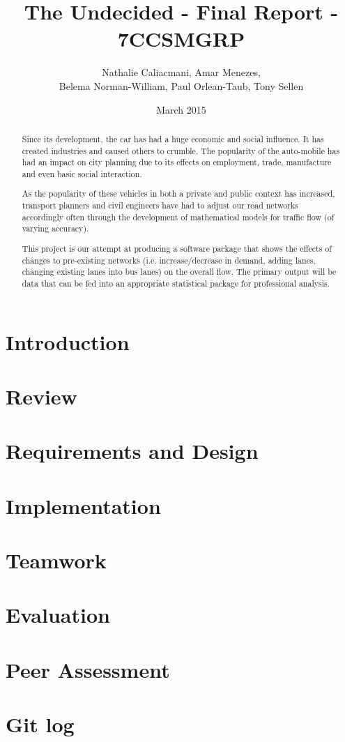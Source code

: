 \documentclass[titlepage]{article}
\title{The Undecided - Final Report - 7CCSMGRP}
\author{Nathalie Caliacmani, Amar Menezes, \\ Belema Norman-William, Paul Orlean-Taub, Tony Sellen}
\date{March 2015}
\begin{document}

\maketitle

\begin{abstract}
Since its development, the car has had a huge economic and social influence. It has created industries and caused others to crumble. The popularity of the auto-mobile has had an impact on city planning due to its effects on employment, trade, manufacture and even basic social interaction.

As the popularity of these vehicles in both a private and public context has increased, transport planners and civil engineers have had to adjust our road networks accordingly often through the development of mathematical models for traffic flow (of varying accuracy).

This project is our attempt at producing a software  package that shows the effects of changes to pre-existing networks (i.e. increase/decrease in demand, adding lanes, changing existing lanes into bus lanes) on the overall flow. The primary output will be data that can be fed into an appropriate statistical package for professional analysis.
\end{abstract}

\tableofcontents
\newpage

\section{Introduction}
	

\section{Review}
	
	
\section{Requirements and Design}
	
\section{Implementation}
	
\section{Teamwork}
	
\section{Evaluation}
	

\section{Peer Assessment}
	
	



\appendix
\section{Git log}

\end{document}
